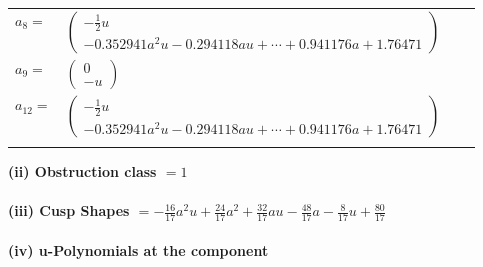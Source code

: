 \documentclass[1p]{elsarticle_modified}
\theoremstyle{definition}
\begin{document}
\begin{tabular}{m{7pt} m{180pt} m{7pt} m{180pt} }
\flushright $a_{8}=$&$\begin{pmatrix}-\frac{1}{2} u\\-0.352941 a^{2} u-0.294118 a u+\cdots+0.941176 a+1.76471\end{pmatrix}$ \\
\flushright $a_{9}=$&$\begin{pmatrix}0\\- u\end{pmatrix}$ \\
\flushright $a_{12}=$&$\begin{pmatrix}-\frac{1}{2} u\\-0.352941 a^{2} u-0.294118 a u+\cdots+0.941176 a+1.76471\end{pmatrix}$\\&\end{tabular}
\flushleft \textbf{(ii) Obstruction class $= 1$}\\~\\
\flushleft \textbf{(iii) Cusp Shapes $= -\frac{16}{17} a^2 u+\frac{24}{17} a^2+\frac{32}{17} a u-\frac{48}{17} a-\frac{8}{17} u+\frac{80}{17}$}\\~\\
\newpage\renewcommand{\arraystretch}{1}
\flushleft \textbf{(iv) u-Polynomials at the component}\newline \\
\end{document}
